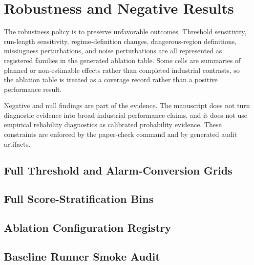 \section{Robustness and Negative Results}
\label{supp:robustness}

The robustness policy is to preserve unfavorable outcomes. Threshold sensitivity, run-length sensitivity, regime-definition changes, dangerous-region definitions, missingness perturbations, and noise perturbations are all represented as registered families in the generated ablation table. Some cells are summaries of planned or non-estimable effects rather than completed industrial contrasts, so the ablation table is treated as a coverage record rather than a positive performance result.

Negative and null findings are part of the evidence. The manuscript does not turn diagnostic evidence into broad industrial performance claims, and it does not use empirical reliability diagnostics as calibrated probability evidence. These constraints are enforced by the paper-check command and by generated audit artifacts.

\subsection{Full Threshold and Alarm-Conversion Grids}





\subsection{Full Score-Stratification Bins}



\subsection{Ablation Configuration Registry}



\subsection{Baseline Runner Smoke Audit}


